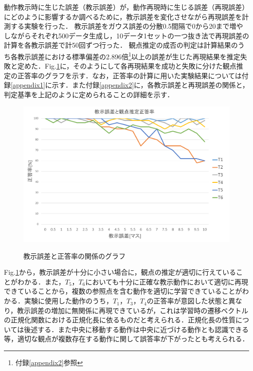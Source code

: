 動作教示時に生じた誤差（教示誤差）が，動作再現時に生じる誤差（再現誤差）にどのように影響するか調べるために，教示誤差を変化させながら再現誤差を計測する実験を行った．
教示誤差をガウス誤差の分散0.5間隔で0から20まで増やしながらそれぞれ500データ生成し，10データ1セットの一つ抜き法で再現誤差の計算を各教示誤差で計50回ずつ行った．
観点推定の成否の判定は計算結果のうち各教示誤差における標準偏差の2.896倍\footnote{付録\ref{appendix2}参照}以上の誤差が生じた再現結果を推定失敗と定めた．Fig.\ref{figure:success_rate}に，そのようにして各再現結果を成功と失敗に分けた観点推定の正答率のグラフを示す．なお，正答率の計算に用いた実験結果については付録\ref{appendix1}に示す．また付録\ref{appendix2}に，各教示誤差と再現誤差の関係と，判定基準を上記のように定められることの詳細を示す．
	\begin{figure}[h]
		\begin{center}
			\includegraphics[width=14cm]{chart2.png} \\ %
			\caption{教示誤差と正答率の関係のグラフ}
			\label{figure:success_rate}
		\end{center}
	\end{figure}

Fig.\ref{figure:success_rate}から，教示誤差が十分に小さい場合に，観点の推定が適切に行えていることがわかる．また，$T_{5}$，$T_{6}$においても十分に正確な教示動作において適切に再現できていることから，複数の参照点を含む動作を適切に学習できていることがわかる．実験に使用した動作のうち，$T_{1}$，$T_{3}$，$T_{4}$の正答率が意図した状態と異なり，教示誤差の増加に無関係に再現できているが，これは学習時の遷移ベクトルの正規化関数における正規化長に依るものだと考えられる．正規化長の性質については後述する．また中央に移動する動作は中央に近づける動作とも認識できる等，適切な観点が複数存在する動作に関して誤答率が下がったとも考えられる．

